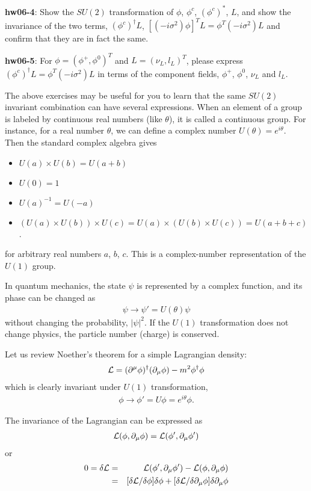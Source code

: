 \documentclass[12pt]{article}
\def\del{{\partial}}
\begin{document}
{\bf hw06-4}: Show the $SU(2)$ transformation of $\phi$, $\phi^c$,
  $(\phi^c)^*$, $L$, and show the invariance of the two terms,
  $(\phi^c)^\dagger L$, $[(-i\sigma^2) \phi]^T L = \phi^T (-i\sigma^2) L$
  and confirm that they are in fact the same.

{\bf hw06-5}:  For $\phi = (\phi^+, \phi^0)^T$ and $L = (\nu_L, l_L)^T$,
  please express
  $(\phi^c)^\dagger L =  \phi^T (-i\sigma^2) L$
  in terms of the component fields, $\phi^+$, $\phi^0$,
  $\nu_L$ and $l_L$.

  The above exercises may be useful for you to learn that the same
  $SU(2)$ invariant combination can have several expressions.
  When an element of a group is labeled by continuous real numbers
  (like $\theta$), it is called a continuous group.
  For instance, for a real number $\theta$, we can define a complex number
  $U(\theta) = e^{i\theta}$.
  Then the standard complex algebra gives
 \begin{itemize}
   \item $U(a) \times U(b) = U(a+b)$
   \item $U(0) = 1$
   \item $U(a)^{-1} = U(-a)$
   \item $(U(a)\times U(b))\times U(c) = U(a)\times (U(b)\times U(c)) = U(a+b+c)$.
 \end{itemize}
  for arbitrary real numbers $a$, $b$, $c$.  This is a complex-number
  representation of the $U(1)$ group.

  In quantum mechanics, the state $\psi$ is represented by a complex
  function, and its phase can be changed as
\begin{eqnarray}
  \psi \to \psi' = U(\theta) \psi
\end{eqnarray}
  without changing the probability, $|\psi|^2$.  If the $U(1)$ transformation
  does not change physics, the particle number (charge) is conserved.

  Let us review Noether's theorem for a simple Lagrangian density:
\begin{eqnarray}
  {\cal L}  =  (\del^\mu \phi)^\dagger (\del_\mu \phi) -m^2 \phi^\dagger \phi
\end{eqnarray}
   which is clearly invariant under $U(1)$ transformation,
\begin{eqnarray}
  \phi \to \phi' = U \phi = e^{i\theta} \phi.
\end{eqnarray}

  The invariance of the Lagrangian can be expressed as
  \begin{eqnarray}
    {\cal L}(\phi, \del_\mu \phi) = {\cal L}(\phi', \del_\mu \phi')
  \end{eqnarray}
  or
  \begin{eqnarray}
    0 = \delta {\cal L} &=& {\cal L}(\phi', \del_\mu \phi') - {\cal L}(\phi, \del_\mu \phi)\\
  &=&  [\delta {\cal L} / \delta{\phi}] \delta\phi +  [\delta {\cal L} / \delta{\del_\mu \phi}] \delta{\del_\mu \phi}
  \end{eqnarray}
  
\end{document}

